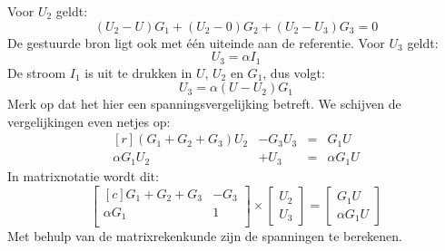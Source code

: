 Voor $U_2$ geldt:
%
\begin{equation}
(U_2-U)G_1 + (U_2-0)G_2 + (U_2-U_3)G_3 = 0
\end{equation}
%
De gestuurde bron ligt ook met \'e\'en uiteinde aan de referentie. Voor $U_3$ geldt:
%
\begin{equation}
U_3 = \alpha I_1
\end{equation}
%
De stroom $I_1$ is uit te drukken in $U$, $U_2$ en $G_1$, dus volgt:
%
\begin{equation}
U_3 = \alpha(U-U_2)G_1
\end{equation}
%
Merk op dat het hier een spanningsvergelijking betreft. We schijven de vergelijkingen even netjes op:
%
\begin{equation}
\begin{matrix*}[r]
(G_1+G_2+G_3)U_2 & -G_3U_3 &=& G_1U \\
\alpha G_1U_2 & +U_3 &=& \alpha G_1U
\end{matrix*}
\end{equation}
%
In matrixnotatie wordt dit:
%
\begin{equation}
\begin{bmatrix*}[c]
G_1+G_2+G_3 & -G_3 \\
\alpha G_1  &    1 \\
\end{bmatrix*}
\times
\begin{bmatrix}
U_2 \\ U_3
\end{bmatrix}=
\begin{bmatrix}
G_1U \\ \alpha G_1U
\end{bmatrix}
\end{equation}
%
Met behulp van de matrixrekenkunde zijn de spanningen te berekenen.

